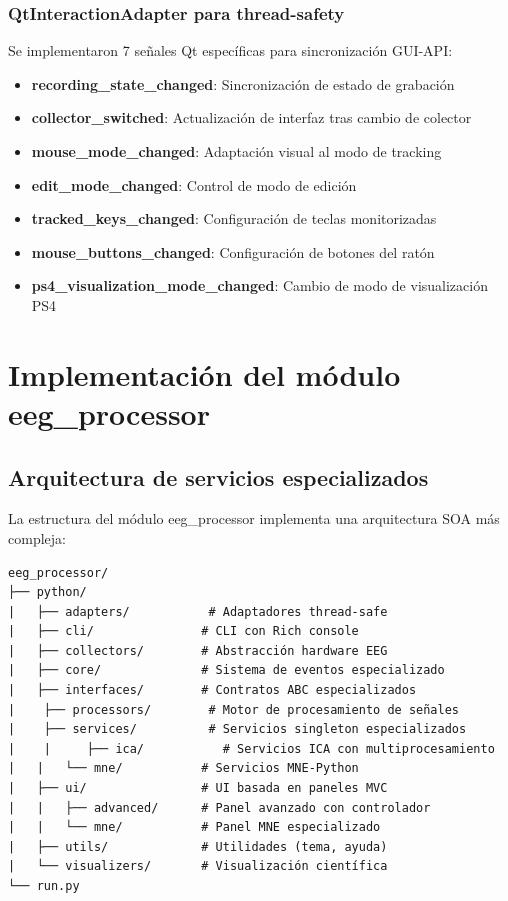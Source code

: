 \subsubsection{QtInteractionAdapter para thread-safety}

Se implementaron 7 señales Qt específicas para sincronización GUI-API:

\begin{itemize}
    \item \textbf{recording\_state\_changed}: Sincronización de estado de grabación
    \item \textbf{collector\_switched}: Actualización de interfaz tras cambio de colector
    \item \textbf{mouse\_mode\_changed}: Adaptación visual al modo de tracking
    \item \textbf{edit\_mode\_changed}: Control de modo de edición
    \item \textbf{tracked\_keys\_changed}: Configuración de teclas monitorizadas
    \item \textbf{mouse\_buttons\_changed}: Configuración de botones del ratón
    \item \textbf{ps4\_visualization\_mode\_changed}: Cambio de modo de visualización PS4
\end{itemize}

\section{Implementación del módulo eeg\_processor}
\label{sec:implementacion_eeg_processor}

\subsection{Arquitectura de servicios especializados}
\label{subsec:arquitectura_servicios_eeg}

La estructura del módulo eeg\_processor implementa una arquitectura SOA más compleja:

\begin{verbatim}
eeg_processor/
├── python/
|   ├── adapters/           # Adaptadores thread-safe
|   ├── cli/               # CLI con Rich console
|   ├── collectors/        # Abstracción hardware EEG
|   ├── core/              # Sistema de eventos especializado
|   ├── interfaces/        # Contratos ABC especializados
|    ├── processors/        # Motor de procesamiento de señales
|    ├── services/          # Servicios singleton especializados
|    |     ├── ica/           # Servicios ICA con multiprocesamiento
|   |   └── mne/           # Servicios MNE-Python
|   ├── ui/                # UI basada en paneles MVC
|   |   ├── advanced/      # Panel avanzado con controlador
|   |   └── mne/           # Panel MNE especializado
|   ├── utils/             # Utilidades (tema, ayuda)
|   └── visualizers/       # Visualización científica
└── run.py
\end{verbatim}

